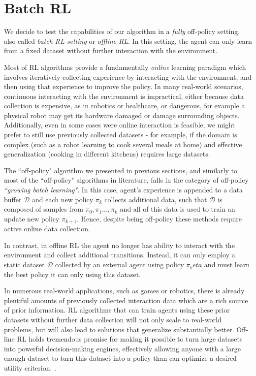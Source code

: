 \chapter{Batch RL}\label{chapter:batchrl}

We decide to test the capabilities of our algorithm in a \textit{fully} off-policy setting, 
also called \textit{batch RL setting} or \textit{offline RL}. In this setting, the agent 
can only learn from a fixed dataset without further interaction with the environment.

Most of RL algorithms provide a fundamentally \textit{online} learning paradigm which involves
iteratively collecting experience by interacting with the environment, and then
using that experience to improve the policy. 
In many  real-world scenarios, continuous interacting with the environment is impractical, either because 
data collection is expensive, as in robotics or healthcare, or dangerous, for example a physical robot may
get its hardware damaged or damage surrounding objects.
Additionally, even in some cases were online interaction is feasible, we might prefer to still use previously
collected datasets - for example, if the domain is complex (such as a robot learning to cook several meals at home)
and effective generalization (cooking in different kitchens) requires large datasets. 


The ``off-policy" algorithm we presented in previous sections, and similarly to most of the ``off-policy"
algorithms in literature, falls in the category of 
off-policy \textit{``growing batch learning"}. In this case, agent's experience is appended to a data buffer 
$\mathcal{D}$ and each new policy $\pi_k$ collects additional data, such that $\mathcal{D}$
is composed of samples from $\pi_0,\pi_1...,\pi_k$ and all of this data is used to train an update new
policy $\pi_{k+1}$. 
Hence, despite being off-policy these methods require active online data collection.

In contrast, in offline RL the agent no longer has ability to interact with the environment and collect
additional transitions. Instead, it
can only employ a static dataset $\mathcal{D}$ collected by an external agent using policy $\pi_beta$
and must learn the best policy it can only using this dataset.

In numerous real-world applications, such as games or robotics, there is already plentiful amounts 
of previously collected interaction data which are a rich source of prior information.
RL algorithms that can train agents using these prior datasets without further data collection
will not only scale to real-world problems, but will also lead to solutions that generalize substantially better.
Off-line RL holds tremendous promise for making it possible to turn large datasets into powerful 
decision-making engines, effectively allowing anyone with a large enough dataset to turn this dataset
into a policy than can optimize a desired utility criterion. \citep{levine2020}.




